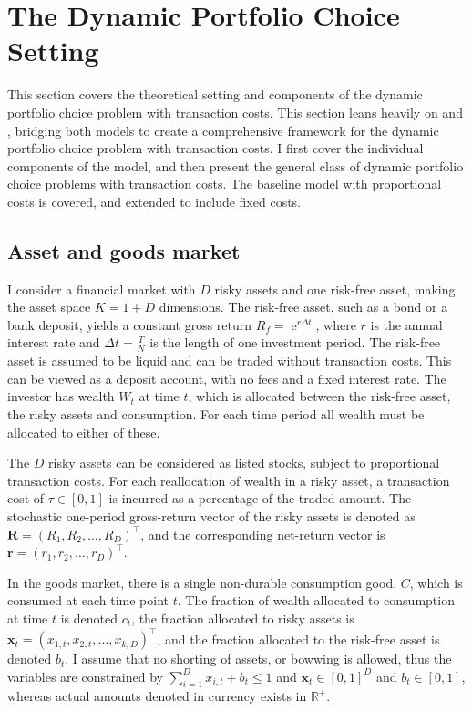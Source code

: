 \documentclass[11pt]{article}
\begin{document}
\fi

\section{The Dynamic Portfolio Choice Setting} \label{Section: Economic-theory}
This section covers the theoretical setting and components of the dynamic portfolio choice problem with transaction costs.
This section leans heavily on \autocite{CaiJuddXu2020} and \autocite{Scheidegger2023},
bridging both models to create a comprehensive framework for the dynamic portfolio choice problem with transaction costs.
I first cover the individual components of the model, and then present the general class of dynamic portfolio choice problems with transaction costs.
The baseline model with proportional costs is covered, and extended to include fixed costs.
\subsection{Asset and goods market} \label{Subsection: Market}
I consider a financial market with \(D\) risky assets and one risk-free asset, making the asset space \(K = 1 + D\) dimensions. 
The risk-free asset, such as a bond or a bank deposit, yields a constant gross return \(R_f = \operatorname{e}^{r\Delta t}\), 
where \(r\) is the annual interest rate and \(\Delta t = \frac{T}{N}\) is the length of one investment period. 
The risk-free asset is assumed to be liquid and can be traded without transaction costs. This can be viewed as a deposit account,
with no fees and a fixed interest rate. The investor has wealth \(W_t\) at time \(t\), which is allocated between the risk-free asset, the risky assets and consumption.
For each time period all wealth must be allocated to either of these.

The \(D\) risky assets can be considered as listed stocks, subject to proportional transaction costs. 
For each reallocation of wealth in a risky asset, a transaction cost of \(\tau \in [0,1]\)
is incurred as a percentage of the traded amount. 
The stochastic one-period gross-return vector of the risky assets is denoted as
\(\mathbf{R} = (R_1, R_2, \ldots, R_D)^\top\), and the corresponding net-return vector is
\(\mathbf{r} = (r_1, r_2, \ldots, r_D)^\top\).

In the goods market, there is a single non-durable consumption good, \(C\), which is consumed at each time point \(t\). 
The fraction of wealth allocated to consumption at time \(t\) is denoted \(c_t\),
the fraction allocated to risky assets is \(\mathbf{x}_t = (x_{1,t}, x_{2,t}, \dots, x_{k,D})^\top\),
and the fraction allocated to the risk-free asset is denoted \(b_t\). 
I assume that no shorting of assets, or bowwing is allowed,
thus the variables are constrained by \(\sum_{i=1}^D x_{i,t} + b_t \leq 1\) and
\(\mathbf{x}_t \in [0,1]^D\) and \(b_t \in [0,1]\), whereas actual amounts denoted in currency exists in $\mathbb{R}^{+}$.
\end{document}

